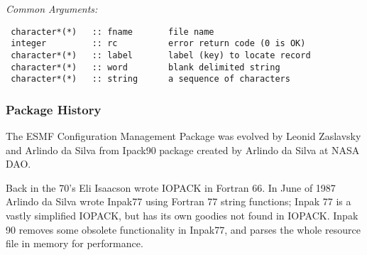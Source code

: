  {\em Common Arguments:}

 \begin{verbatim}
 character*(*)   :: fname       file name
 integer         :: rc          error return code (0 is OK)
 character*(*)   :: label       label (key) to locate record
 character*(*)   :: word        blank delimited string
 character*(*)   :: string      a sequence of characters
 \end{verbatim}


    \subsubsection{Package History}
       The ESMF Configuration Management Package was evolved by 
       Leonid Zaslavsky and Arlindo da Silva from Ipack90 package
       created by Arlindo da Silva at NASA DAO.

       Back in the 70's Eli Isaacson wrote IOPACK in Fortran
       66.  In June of 1987 Arlindo da Silva wrote Inpak77 using
       Fortran 77 string functions; Inpak 77 is a vastly
       simplified IOPACK, but has its own goodies not found in
       IOPACK.  Inpak 90 removes some obsolete functionality in
       Inpak77, and parses the whole resource file in memory for
       performance. 



